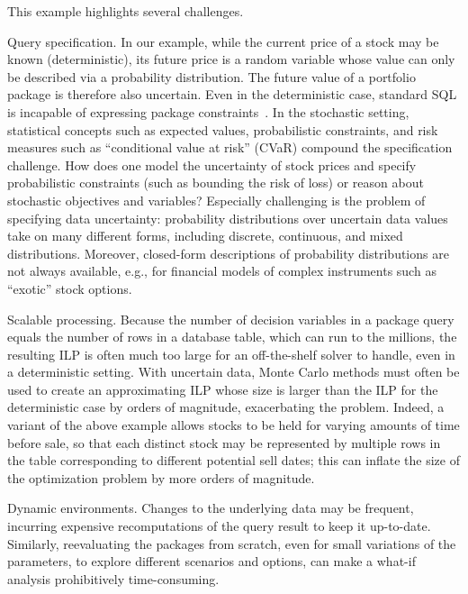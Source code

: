 \documentclass[11pt]{article}
\newenvironment{compactdesc}%
  {\begin{description}%
        \setlength{\itemsep}{0pt}
        \setlength{\parskip}{0pt}
        \setlength{\topsep}{0pt}
        \setlength{\itemindent}{0pt}
        \setlength{\leftmargin}{0pt}}%
  {\end{description}}
\begin{document}
\smallskip
This example highlights several challenges. 
\begin{compactdesc}
    
\item[Query specification.] In our example, while the current price of a stock
may be known (deterministic), its future price is a random variable whose value
can only be described via a probability distribution. The future value of a
portfolio package is therefore also uncertain. Even in the deterministic case,
standard SQL is incapable of expressing package
constraints~\cite{BrucatoAM18,BrucatoBAM16}. In the stochastic setting,
statistical concepts such as expected values, probabilistic constraints, and
risk measures such as ``conditional value at risk'' (CVaR) compound the
specification challenge. How does one model the uncertainty of stock prices and
specify probabilistic constraints (such as bounding the risk of loss) or reason
about stochastic objectives and variables? Especially challenging is the
problem of specifying data uncertainty: probability distributions over
uncertain data values take on many different forms, including discrete,
continuous, and mixed distributions. Moreover, closed-form descriptions of
probability distributions are not always available, e.g., for financial models
of complex instruments such as ``exotic'' stock options. 

\item[Scalable processing.] Because the number of decision variables in a package query equals the number of rows in a database table, which can run to the millions, the resulting ILP is often much too large for an off-the-shelf solver to handle, even in a deterministic setting. With uncertain data, Monte Carlo methods must often be used to create an approximating ILP whose size is larger than the ILP for the deterministic case by orders of magnitude, exacerbating the problem. Indeed, a variant of the above example allows stocks to be held for varying amounts of time before sale, so that each distinct stock may be represented by multiple rows in the table corresponding to different potential sell dates; this can inflate the size of the optimization problem by more orders of magnitude.

\item[Dynamic environments.] Changes to the underlying data may be frequent, incurring expensive recomputations of the query result to keep it up-to-date. Similarly, reevaluating the packages from scratch, even for small variations of the parameters, to explore different scenarios and options, can make a what-if analysis prohibitively time-consuming.


\end{compactdesc}
\end{document}
